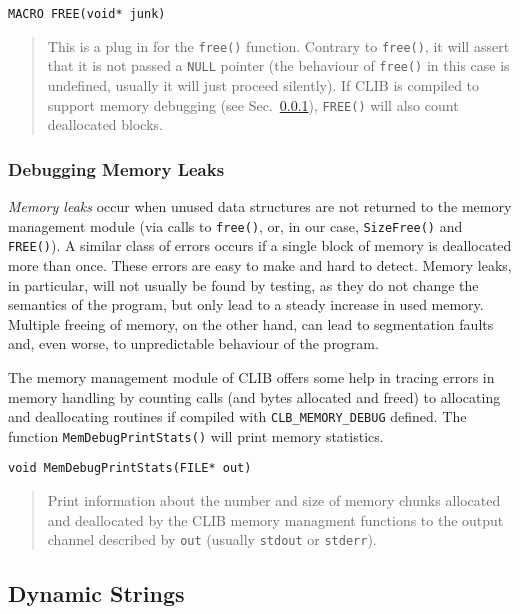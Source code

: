 \begin{verbatim}
MACRO FREE(void* junk)
\end{verbatim}
\begin{quote}
  This is a plug in for the \texttt{free()} function. Contrary to
  \texttt{free()}, it will assert that it is not passed a
  \texttt{NULL} pointer (the behaviour of \texttt{free()} in this case
  is undefined, usually it will just proceed silently). If CLIB is
  compiled to support memory debugging (see
  Sec.~\ref{sec:basics:memory:debug}), \texttt{FREE()} will also count
  deallocated blocks.
\end{quote}


\subsubsection{Debugging Memory Leaks}
\label{sec:basics:memory:debug}

\emph{Memory leaks} occur when unused data structures are not returned
to the memory management module (via calls to \texttt{free()}, or, in
our case, \texttt{SizeFree()} and \texttt{FREE()}). A similar class of
errors occurs if a single block of memory is deallocated more than
once. These errors are easy to make and hard to detect. Memory leaks,
in particular, will not usually be found by testing, as they do not
change the semantics of the program, but only lead to a steady
increase in used memory. Multiple freeing of memory, on the other
hand, can lead to segmentation faults and, even worse, to
unpredictable behaviour of the program.

The memory management module of CLIB offers some help in tracing
errors in memory handling by counting calls (and bytes allocated and
freed) to allocating and deallocating routines if compiled with
\texttt{CLB\_MEMORY\_DEBUG} defined. The function
\texttt{MemDebugPrintStats()} will print memory statistics.

\begin{verbatim}
void MemDebugPrintStats(FILE* out)
\end{verbatim}
\begin{quote}
  Print information about the number and size of memory chunks
  allocated and deallocated by the CLIB memory managment functions to
  the output channel described by \texttt{out} (usually
  \texttt{stdout} or \texttt{stderr}).
\end{quote}





\subsection{Dynamic Strings}
\label{sec:basics:strings}

